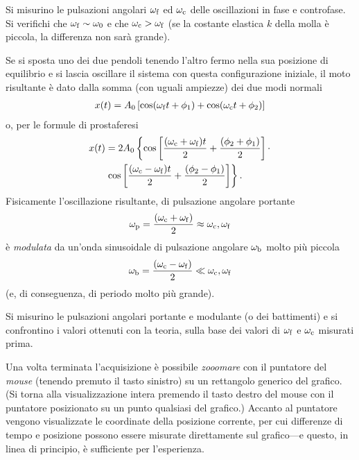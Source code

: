 \documentclass{lab1-article}
\begin{document}
\begin{article}
Si misurino le pulsazioni angolari $\omega_{\rm f}$ ed $\omega_{\rm c}$ delle
oscillazioni in fase e controfase. Si verifichi che
$\omega_{\rm f} \sim \omega_0$ e che $\omega_{\rm c} > \omega_{\rm f}$
(se la costante elastica $k$ della molla \`e piccola, la differenza non sar\`a
grande).



Se si sposta uno dei due pendoli tenendo l'altro fermo nella sua posizione
di equilibrio e si lascia oscillare il sistema con questa configurazione
iniziale, il moto risultante \`e dato dalla somma (con uguali ampiezze)
dei due modi normali
\begin{align}
  x(t) = A_0 \left[ \cos(\omega_{\rm f}t + \phi_1) +
    \cos(\omega_{\rm c}t + \phi_2)\right]
\end{align}
o, per le formule di prostaferesi
\begin{align}
  x(t) & = 2A_0 \left\{
    \cos\left[\frac{(\omega_{\rm c} + \omega_{\rm f})t}{2} +
      \frac{(\phi_2 + \phi_1)}{2} \right] \cdot \right. \nonumber\\
     & \left. \cos\left[\frac{(\omega_{\rm c} - \omega_{\rm f})t}{2} +
      \frac{(\phi_2 - \phi_1)}{2} \right]
    \right\}.
\end{align}
Fisicamente l'oscillazione risultante, di pulsazione angolare portante
\begin{align}
  \omega_{\rm p} = \frac{(\omega_{\rm c} + \omega_{\rm f})}{2}
  \approx \omega_{\rm c},\omega_{\rm f}
\end{align}
\`e \emph{modulata} da un'onda sinusoidale di pulsazione angolare
$\omega_{\rm b}$ molto pi\`u piccola
\begin{align}
  \omega_{\rm b} = \frac{(\omega_{\rm c} - \omega_{\rm f})}{2} \ll
  \omega_{\rm c},\omega_{\rm f}
\end{align}
(e, di conseguenza, di periodo molto pi\`u grande).

Si misurino le pulsazioni angolari portante e modulante (o dei battimenti)
e si confrontino i valori ottenuti con la teoria, sulla base dei valori
di $\omega_{\rm f}$ e $\omega_{\rm c}$ misurati prima.


\secconsiderations

Una volta terminata l'acquisizione \`e possibile \emph{zooomare} con il
puntatore del \emph{mouse} (tenendo premuto il tasto sinistro) su un rettangolo
generico del grafico.
(Si torna alla visualizzazione intera premendo il tasto destro del mouse
con il puntatore posizionato su un punto qualsiasi del grafico.)
Accanto al puntatore vengono visualizzate le coordinate della posizione
corrente, per cui differenze di tempo e posizione possono essere 
misurate direttamente sul grafico---e questo, in linea di principio, \`e
sufficiente per l'esperienza.


\end{article}
\end{document}
